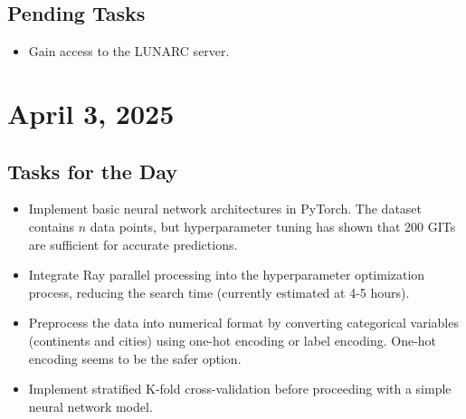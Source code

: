 \documentclass{article}
\begin{document}
\subsection*{Pending Tasks}
\begin{itemize}
    \item Gain access to the LUNARC server.
\end{itemize}

\section{April 3, 2025}

\subsection*{Tasks for the Day}
\begin{itemize}
    \item Implement basic neural network architectures in PyTorch. The dataset contains \( n \) data points, but hyperparameter tuning has shown that 200 GITs are sufficient for accurate predictions.
    \item Integrate Ray parallel processing into the hyperparameter optimization process, reducing the search time (currently estimated at 4-5 hours).
    \item Preprocess the data into numerical format by converting categorical variables (continents and cities) using one-hot encoding or label encoding. One-hot encoding seems to be the safer option.
    \item Implement stratified K-fold cross-validation before proceeding with a simple neural network model.
\end{itemize}
\end{document}
